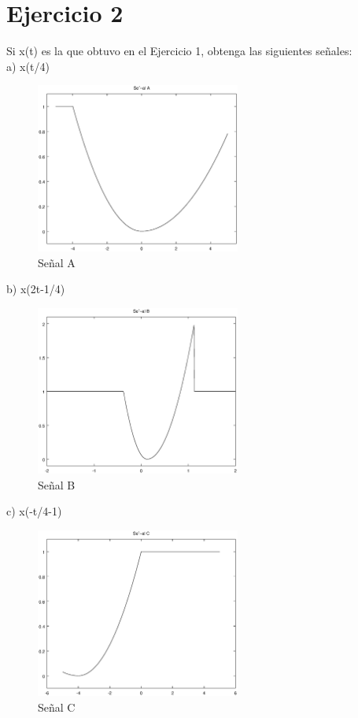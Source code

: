 \documentclass[10pt,a4paper]{report}
\begin{document}
\section{Ejercicio 2}
Si x(t) es la que obtuvo en el Ejercicio 1, obtenga las siguientes señales:\\
a) x(t/4)

\begin{figure}[H]
\centering
\includegraphics[width=0.6\textwidth]{SignalA}
\caption{Señal A}
\label{fig:SignalA}
\end{figure}

b) x(2t-1/4)

\begin{figure}[H]
\centering
\includegraphics[width=0.6\textwidth]{SignalB}
\caption{Señal B}
\label{fig:SignalB}
\end{figure}

c) x(-t/4-1)

\begin{figure}[H]
\centering
\includegraphics[width=0.6\textwidth]{SignalC}
\caption{Señal C}
\label{fig:SignalC}
\end{figure}
\end{document}
